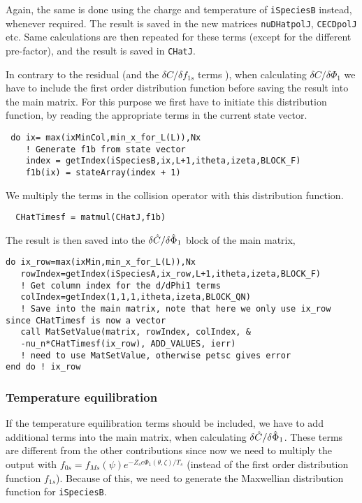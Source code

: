 \documentclass[12pt]{article}
\begin{document}
\noindent
Again, the same is done using the charge and temperature of \texttt{iSpeciesB} instead, whenever required. 
The result is saved in the new matrices \texttt{nuDHatpolJ}, \texttt{CECDpolJ} etc. Same calculations are then repeated for these terms (except for the different pre-factor), and the result is saved in \texttt{CHatJ}. 

In contrary to the residual (and the $\delta C/\delta f_{1s}$ terms ), when calculating $\delta C/\delta \Phi_1$ we have to include the first order distribution function before saving the result into the main matrix. For this purpose we first have to initiate this distribution function, by reading the appropriate terms in the current state vector. 

\begin{lstlisting}
 do ix= max(ixMinCol,min_x_for_L(L)),Nx
    ! Generate f1b from state vector
    index = getIndex(iSpeciesB,ix,L+1,itheta,izeta,BLOCK_F) 
    f1b(ix) = stateArray(index + 1)
\end{lstlisting}

\noindent
We multiply the terms in the collision operator with this distribution function.

 \begin{lstlisting}
  CHatTimesf = matmul(CHatJ,f1b)
 \end{lstlisting}
\noindent
The result is then saved into the $\delta \Hat C/\delta \hat \Phi_1$ block of the main matrix,

 \begin{lstlisting}
do ix_row=max(ixMin,min_x_for_L(L)),Nx
   rowIndex=getIndex(iSpeciesA,ix_row,L+1,itheta,izeta,BLOCK_F)
   ! Get column index for the d/dPhi1 terms
   colIndex=getIndex(1,1,1,itheta,izeta,BLOCK_QN)
   ! Save into the main matrix, note that here we only use ix_row since CHatTimesf is now a vector
   call MatSetValue(matrix, rowIndex, colIndex, & 
   -nu_n*CHatTimesf(ix_row), ADD_VALUES, ierr) 
   ! need to use MatSetValue, otherwise petsc gives error
end do ! ix_row
\end{lstlisting}
\noindent

\subsubsection*{Temperature equilibration}
\label{sec:Jac2}
If the temperature equilibration terms should be included, we have to add additional terms into the main matrix, when calculating  $\delta \Hat C/\delta \hat \Phi_1$. These terms are different from the other contributions since now we need to multiply the output with $f_{0s} = f_{Ms}(\psi)e^{-Z_se\Phi_1(\theta,\zeta)/T_s}$ (instead of the first order distribution function $f_{1s}$). Because of this, we need to generate the Maxwellian distribution function for \texttt{iSpeciesB}.
\end{document}
